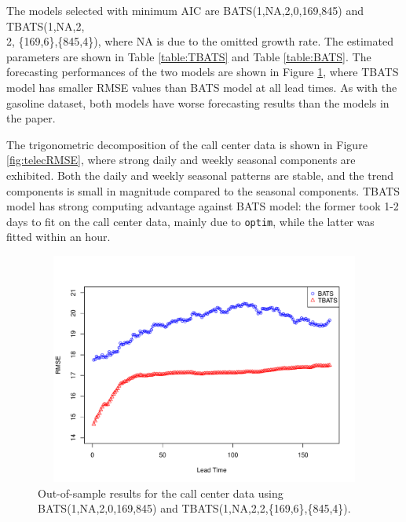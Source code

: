 \documentclass{uwstat572}
\newcommand{\vmadd}[1]{\textbf{\color{red}{#1}}}
\begin{document}
The models selected with minimum AIC are BATS(1,NA,2,0,169,845) and TBATS(1,NA,2,\\2, \{169,6\},\{845,4\}), where NA is due to the omitted growth rate. The estimated parameters are shown in Table \ref{table:TBATS} and Table \ref{table:BATS}. The forecasting performances of the two models are shown in Figure \ref{fig:callsRMSE}, where TBATS model has smaller RMSE values than BATS model at all lead times. As with the gasoline dataset, both models have worse forecasting results than the models in the paper.

The trigonometric decomposition of the call center data is shown in Figure \ref{fig:telecRMSE}, where strong daily and weekly seasonal components are exhibited. Both the daily and weekly seasonal patterns are stable, and the trend components is small in magnitude compared to the seasonal components. TBATS model has strong computing advantage against BATS model: the former took 1-2 days to fit on the call center data, mainly due to \texttt{optim}, while the latter was fitted within an hour. 


\begin{figure}[]
\centering
  \includegraphics[width=6in,height=3in]{callsRMSE.pdf}
  \caption{Out-of-sample \vmadd{prediction} results for the call center data using BATS(1,NA,2,0,169,845) and TBATS(1,NA,2,2,\{169,6\},\{845,4\}).}
  \label{fig:callsRMSE}
\end{figure}
\end{document}
